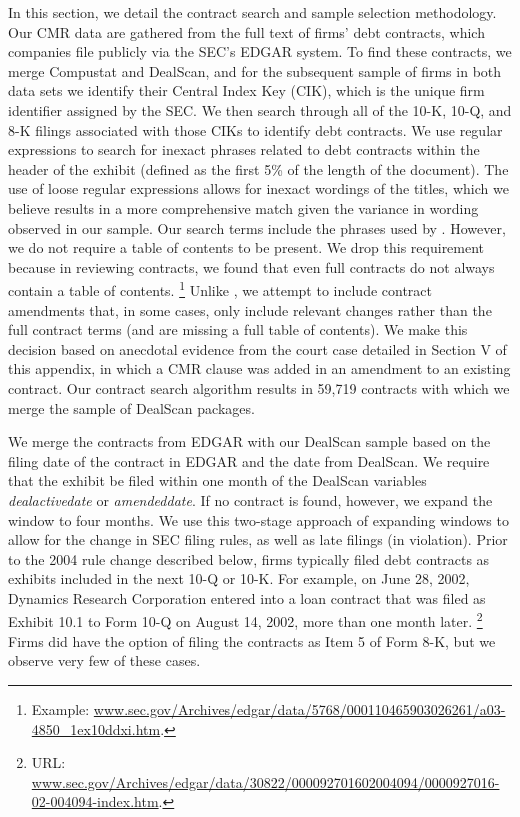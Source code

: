 \documentclass[12pt]{article}
\begin{document}
\begin{appendices}
In this section, we detail the contract search and sample selection methodology.
Our CMR data are gathered from the full text of firms' debt contracts, which companies file publicly via the SEC's EDGAR system.
To find these contracts, we merge Compustat and DealScan, and for the subsequent sample of firms in both data sets we identify their Central Index Key (CIK), which is the unique firm identifier assigned by the SEC.
We then search through all of the 10-K, 10-Q, and 8-K filings associated with those CIKs to identify debt contracts.
We use regular expressions to search for inexact phrases related to debt contracts within the header of the exhibit (defined as the first 5\% of the length of the document).
The use of loose regular expressions allows for inexact wordings of the titles, which we believe results in a more comprehensive match given the variance in wording observed in our sample.
Our search terms include the phrases used by \cite{Nini_2009}.
However, we do not require a table of contents to be present. We drop this requirement because in reviewing contracts, we found that even full contracts do not always contain a table of contents.%
    \footnote{Example: \href{http://www.sec.gov/Archives/edgar/data/5768/000110465903026261/a03-4850\_1ex10ddxi.htm}{www.sec.gov/Archives/edgar/data/5768/000110465903026261/a03-4850\_1ex10ddxi.htm}.}
Unlike \cite{Nini_2009}, we attempt to include contract amendments that, in some cases, only include relevant changes rather than the full contract terms (and are missing a full table of contents).
We make this decision based on anecdotal evidence from the court case detailed in Section V of this appendix, in which a CMR clause was added in an amendment to an existing contract.
Our contract search algorithm results in 59,719 contracts with which we merge the sample of DealScan packages.


We merge the contracts from EDGAR with our DealScan sample based on the filing date of the contract in EDGAR and the date from DealScan.
We require that the exhibit be filed within one month of the DealScan variables \textit{dealactivedate} or \textit{amendeddate}.
If no contract is found, however, we expand the window to four months.
We use this two-stage approach of expanding windows to allow for the change in SEC filing rules, as well as late filings (in violation).
Prior to the 2004 rule change described below, firms typically filed debt contracts as exhibits included in the next 10-Q or 10-K.
For example, on June 28, 2002, Dynamics Research Corporation entered into a loan contract that was filed as Exhibit 10.1 to Form 10-Q on August 14, 2002, more than one month later.%
    \footnote{URL: \href{http://www.sec.gov/Archives/edgar/data/30822/000092701602004094/0000927016-02-004094-index.htm}{www.sec.gov/Archives/edgar/data/30822/000092701602004094/0000927016-02-004094-index.htm}.}
Firms did have the option of filing the contracts as Item 5 of Form 8-K, but we observe very few of these cases.%



\end{appendices}
\end{document}
